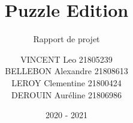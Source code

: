 \documentclass[report]{BetterDocument}
\title{Puzzle Edition}
\subtitle{Rapport de projet}
\author{VINCENT Leo 21805239\\
BELLEBON Alexandre 21808613\\
LEROY Clementine 21800424\\
DEROUIN Auréline 21806986}
\date{2020 - 2021}
\institute{Unicaen}
\begin{document}
	\pageDeGarde

	\tableDesMatieres

	

	

	
\end{document}
